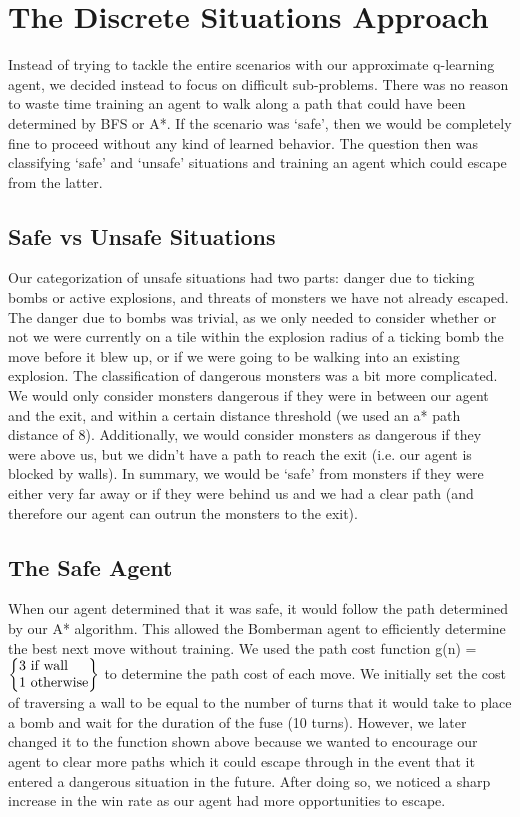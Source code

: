 \documentclass{article}
\begin{document}
\section{The Discrete Situations Approach}
Instead of trying to tackle the entire scenarios with our approximate q-learning agent, we decided instead to focus on difficult sub-problems. There was no reason to waste time training an agent to walk along a path that could have been determined by BFS or A*. If the scenario was ‘safe’, then we would be completely fine to proceed without any kind of learned behavior. The question then was classifying ‘safe’ and ‘unsafe’ situations and training an agent which could escape from the latter.

\subsection*{Safe vs Unsafe Situations}
Our categorization of unsafe situations had two parts: danger due to ticking bombs or active explosions, and threats of monsters we have not already escaped. The danger due to bombs was trivial, as we only needed to consider whether or not we were currently on a tile within the explosion radius of a ticking bomb the move before it blew up, or if we were going to be walking into an existing explosion.
The classification of dangerous monsters was a bit more complicated. We would only consider monsters dangerous if they were in between our agent and the exit, and within a certain distance threshold (we used an a* path distance of 8). Additionally, we would consider monsters as dangerous if they were above us, but we didn’t have a path to reach the exit (i.e. our agent is blocked by walls). In summary, we would be ‘safe’ from monsters if they were either very far away or if they were behind us and we had a clear path (and therefore our agent can outrun the monsters to the exit).

\subsection*{The Safe Agent}
When our agent determined that it was safe, it would follow the path determined by our A* algorithm. This allowed the Bomberman agent to efficiently determine the best next move without training. We used the path cost function g(n) = $\left\{
\begin{tabular}{@{}l@{}}
    3 if wall \\
    1 otherwise
\end{tabular}
\right\}$ to determine the path cost of each move. 
We initially set the cost of traversing a wall to be equal to the number of turns that it would take to place a bomb and wait for the duration of the fuse (10 turns). However, we later changed it to the function shown above because we wanted to encourage our agent to clear more paths which it could escape through in the event that it entered a dangerous situation in the future. After doing so, we noticed a sharp increase in the win rate as our agent had more opportunities to escape. 
\end{document}
